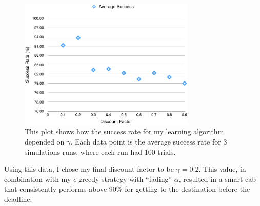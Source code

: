 \documentclass[12pt,letterpaper]{article}
\begin{document}
\begin{figure}[h!]
	\centering
	\includegraphics[width=0.75\textwidth]{SmartCabData.pdf}
	\caption{This plot shows how the success rate for my learning algorithm depended on $\gamma$. Each data point is the average success rate for 3 simulations runs, where each run had 100 trials.}
	\label{fig:gammaplot}
\end{figure}

Using this data, I chose my final discount factor to be $\gamma=0.2$.
This value, in combination with my $\epsilon$-greedy strategy with ``fading'' $\alpha$, resulted in a smart cab that consistently performs above 90\% for getting to the destination before the deadline.
\end{document}
